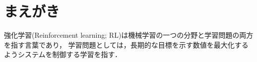 \section{まえがき}
強化学習(Reinforcement learning; RL)は機械学習の一つの分野と学習問題の両方を指す言葉であり，
学習問題としては，長期的な目標を示す数値を最大化するようシステムを制御する学習を指す．
